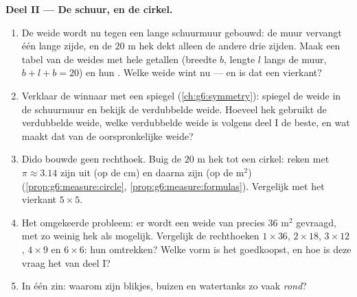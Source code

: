 \begin{problem}
\medskip
\noindent\textbf{Deel II --- De schuur, en de cirkel.}
\begin{enumerate}[resume]
  \item De weide wordt nu tegen een lange schuurmuur gebouwd: de muur vervangt
        één lange zijde, en de $20$ m hek dekt alleen de andere drie zijden.
        Maak een tabel van de weides met hele getallen (breedte $b$, lengte $l$
        langs de muur, $b + l + b = 20$) en hun . Welke weide wint nu
        --- en is dat een vierkant?
  \item Verklaar de winnaar met een spiegel (\cref{ch:g6:symmetry}): spiegel de
        weide in de schuurmuur en bekijk de verdubbelde weide. Hoeveel hek
        gebruikt de verdubbelde weide, welke verdubbelde weide is volgens deel I
        de beste, en wat maakt dat van de oorspronkelijke weide?
  \item Dido bouwde geen rechthoek. Buig de $20$ m hek tot een cirkel: reken met
        $\pi \approx 3.14$ zijn  uit (op de cm) en daarna zijn 
        (op de m$^2$) (\cref{prop:g6:measure:circle},
        \cref{prop:g6:measure:formulas}). Vergelijk met het vierkant
        $5 \times 5$.
  \item Het omgekeerde probleem: er wordt een weide van precies $36$ m$^2$
        gevraagd, met zo weinig hek als mogelijk. Vergelijk de rechthoeken
        $1 \times 36$, $2 \times 18$, $3 \times 12$, $4 \times 9$ en
        $6 \times 6$: hun omtrekken? Welke vorm is het goedkoopst, en hoe is deze
        vraag het  van deel I?
  \item In één zin: waarom zijn blikjes, buizen en watertanks zo vaak
        \emph{rond}?
\end{enumerate}


\end{problem}
